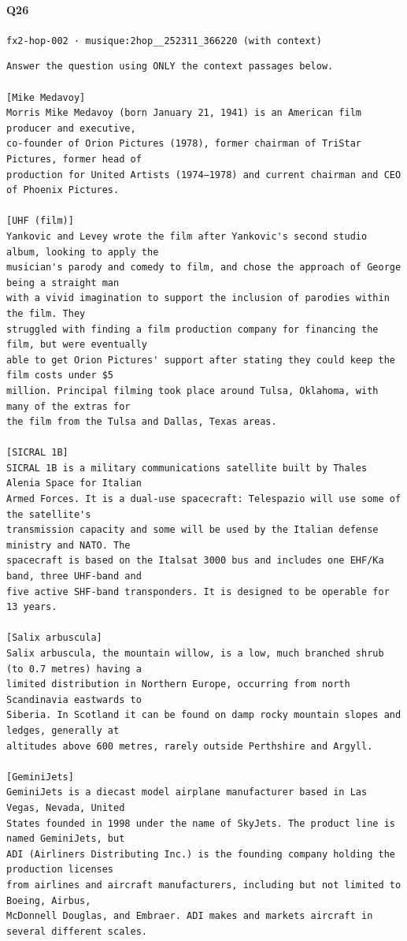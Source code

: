 \documentclass[10pt]{article}
\begin{document}
\paragraph{Q26} \texttt{fx2-hop-002  ·  musique:2hop\_\_252311\_366220 (with context)}
\begin{verbatim}
Answer the question using ONLY the context passages below.

[Mike Medavoy]
Morris Mike Medavoy (born January 21, 1941) is an American film producer and executive,
co-founder of Orion Pictures (1978), former chairman of TriStar Pictures, former head of
production for United Artists (1974–1978) and current chairman and CEO of Phoenix Pictures.

[UHF (film)]
Yankovic and Levey wrote the film after Yankovic's second studio album, looking to apply the
musician's parody and comedy to film, and chose the approach of George being a straight man
with a vivid imagination to support the inclusion of parodies within the film. They
struggled with finding a film production company for financing the film, but were eventually
able to get Orion Pictures' support after stating they could keep the film costs under $5
million. Principal filming took place around Tulsa, Oklahoma, with many of the extras for
the film from the Tulsa and Dallas, Texas areas.

[SICRAL 1B]
SICRAL 1B is a military communications satellite built by Thales Alenia Space for Italian
Armed Forces. It is a dual-use spacecraft: Telespazio will use some of the satellite's
transmission capacity and some will be used by the Italian defense ministry and NATO. The
spacecraft is based on the Italsat 3000 bus and includes one EHF/Ka band, three UHF-band and
five active SHF-band transponders. It is designed to be operable for 13 years.

[Salix arbuscula]
Salix arbuscula, the mountain willow, is a low, much branched shrub (to 0.7 metres) having a
limited distribution in Northern Europe, occurring from north Scandinavia eastwards to
Siberia. In Scotland it can be found on damp rocky mountain slopes and ledges, generally at
altitudes above 600 metres, rarely outside Perthshire and Argyll.

[GeminiJets]
GeminiJets is a diecast model airplane manufacturer based in Las Vegas, Nevada, United
States founded in 1998 under the name of SkyJets. The product line is named GeminiJets, but
ADI (Airliners Distributing Inc.) is the founding company holding the production licenses
from airlines and aircraft manufacturers, including but not limited to Boeing, Airbus,
McDonnell Douglas, and Embraer. ADI makes and markets aircraft in several different scales.


\end{verbatim}
\end{document}
